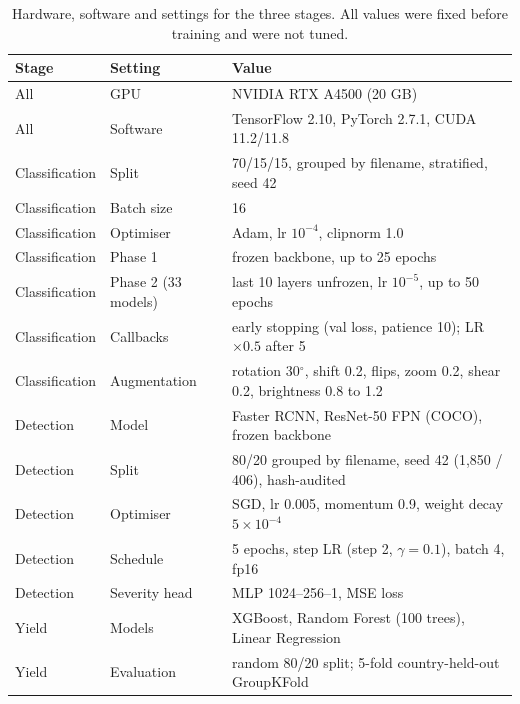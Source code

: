 \begin{table}[!htbp]
\centering
\caption{Hardware, software and settings for the three stages. All values were fixed before training and were not tuned.}
\label{tab:setup}
\small
\begin{tabular}{lll}
\toprule
Stage & Setting & Value \\
\midrule
All & GPU & NVIDIA RTX A4500 (20 GB) \\
All & Software & TensorFlow 2.10, PyTorch 2.7.1, CUDA 11.2/11.8 \\
Classification & Split & 70/15/15, grouped by filename, stratified, seed 42 \\
Classification & Batch size & 16 \\
Classification & Optimiser & Adam, lr $10^{-4}$, clipnorm 1.0 \\
Classification & Phase 1 & frozen backbone, up to 25 epochs \\
Classification & Phase 2 (33 models) & last 10 layers unfrozen, lr $10^{-5}$, up to 50 epochs \\
Classification & Callbacks & early stopping (val loss, patience 10); LR $\times0.5$ after 5 \\
Classification & Augmentation & rotation 30$^\circ$, shift 0.2, flips, zoom 0.2, shear 0.2, brightness 0.8 to 1.2 \\
Detection & Model & Faster RCNN, ResNet-50 FPN (COCO), frozen backbone \\
Detection & Split & 80/20 grouped by filename, seed 42 (1,850 / 406), hash-audited \\
Detection & Optimiser & SGD, lr 0.005, momentum 0.9, weight decay $5\times10^{-4}$ \\
Detection & Schedule & 5 epochs, step LR (step 2, $\gamma=0.1$), batch 4, fp16 \\
Detection & Severity head & MLP 1024--256--1, MSE loss \\
Yield & Models & XGBoost, Random Forest (100 trees), Linear Regression \\
Yield & Evaluation & random 80/20 split; 5-fold country-held-out GroupKFold \\
\bottomrule
\end{tabular}
\end{table}
